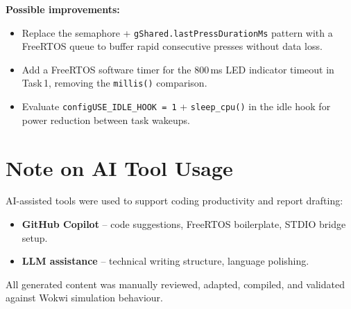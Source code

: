 \documentclass[12pt]{article}
\begin{document}
\textbf{Possible improvements:}
\begin{itemize}
    \item Replace the semaphore + \texttt{gShared.lastPressDurationMs} pattern with a FreeRTOS queue to buffer rapid consecutive presses without data loss.
    \item Add a FreeRTOS software timer for the 800\,ms LED indicator timeout in Task\,1, removing the \texttt{millis()} comparison.
    \item Evaluate \texttt{configUSE\_IDLE\_HOOK = 1} + \texttt{sleep\_cpu()} in the idle hook for power reduction between task wakeups.
\end{itemize}

\section*{Note on AI Tool Usage}
\hspace{0.8cm} AI-assisted tools were used to support coding productivity and report drafting:
\begin{itemize}
    \item \textbf{GitHub Copilot} -- code suggestions, FreeRTOS boilerplate, STDIO bridge setup.
    \item \textbf{LLM assistance} -- technical writing structure, language polishing.
\end{itemize}
All generated content was manually reviewed, adapted, compiled, and validated against Wokwi simulation behaviour.

\end{document}

